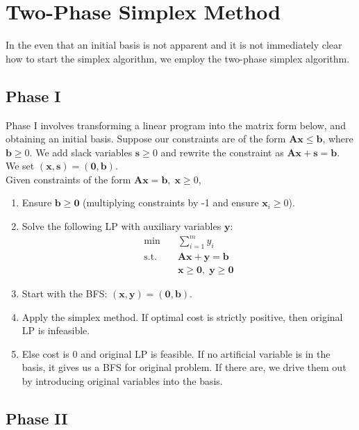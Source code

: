 \documentclass{article}
\begin{document}
\section{Two-Phase Simplex Method}
In the even that an initial basis is not apparent and it is not immediately clear how to start the simplex algorithm, we employ the two-phase simplex algorithm.

\subsection{Phase I}
Phase I involves transforming a linear program into the matrix form below, and obtaining an initial basis. Suppose our constraints are of the form $\mathbf{Ax} \leq \mathbf{b}$, where $\mathbf{b} \geq 0$. We add slack variables $\mathbf{s} \geq 0$ and rewrite the constraint as $\mathbf{Ax} + \mathbf{s} = \mathbf{b}$. We set $(\mathbf{x}, \mathbf{s}) = (\mathbf{0}, \mathbf{b})$. \\ 

\noindent Given constraints of the form $\mathbf{Ax} = \mathbf{b}, \; \mathbf{x} \geq 0$, \begin{enumerate}
    \item Ensure $\mathbf{b} \geq \mathbf{0}$ (multiplying constraints by -1 and ensure $\mathbf{x}_i \geq 0$). 
    \item Solve the following LP with auxiliary variables $\mathbf{y}$: \begin{align}\label{eqn:4-phase1}
        \min \quad & \sum_{i=1}^{m} y_i \\ \nonumber
        \text{s.t.} \quad & \mathbf{Ax} + \mathbf{y} = \mathbf{b} \\ \nonumber
        \quad & \mathbf{x} \geq \mathbf{0}, \; \mathbf{y} \geq \mathbf{0}
    \end{align}
    \item Start with the BFS: $(\mathbf{x}, \mathbf{y}) = (\mathbf{0}, \mathbf{b})$. 
    \item Apply the simplex method. If optimal cost is strictly positive, then original LP is infeasible. 
    \item Else cost is 0 and original LP is feasible. If no artificial variable is in the basis, it gives us a BFS for original problem. If there are, we drive them out by introducing original variables into the basis. 
\end{enumerate}

\subsection{Phase II}
\end{document}
